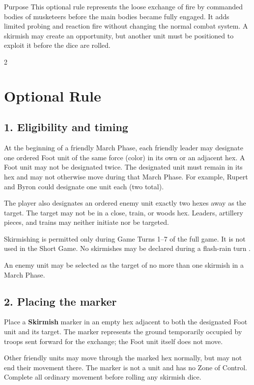 \begin{rulebox}{Purpose}
This optional rule represents the loose exchange of fire by commanded bodies of
musketeers before the main bodies became fully engaged. It adds limited probing
and reaction fire without changing the normal combat system. A skirmish may
create an opportunity, but another unit must be positioned to exploit it before
the dice are rolled.
\end{rulebox}

\begin{multicols}{2}
\section{Optional Rule}

\subsection{1. Eligibility and timing}

At the beginning of a friendly March Phase, each friendly leader may designate
one ordered Foot unit of the same force (color) in its own or an adjacent hex.
A Foot unit may not be designated twice. The designated unit must remain in its
hex and may not otherwise move during that March Phase. For example, Rupert and
Byron could designate one unit each (two total).

The player also designates an ordered enemy unit exactly two hexes away as the
target. The target may not be in a close, train, or woods hex. Leaders,
artillery pieces, and trains may neither initiate nor be targeted.

Skirmishing is permitted only during Game Turns 1--7 of the full game. It is not
used in the Short Game. No skirmishes may be declared during a flash-rain turn
.

An enemy unit may be selected as the target of no more than one skirmish in a
March Phase.

\subsection{2. Placing the marker}

Place a \textbf{Skirmish} marker in an empty hex adjacent to both the designated
Foot unit and its target. The marker represents the ground temporarily occupied
by troops sent forward for the exchange; the Foot unit itself does not move.

Other friendly units may move through the marked hex normally, but may not end
their movement there. The marker is not a unit and has no Zone of Control.
Complete all ordinary movement before rolling any skirmish dice.


\end{multicols}
